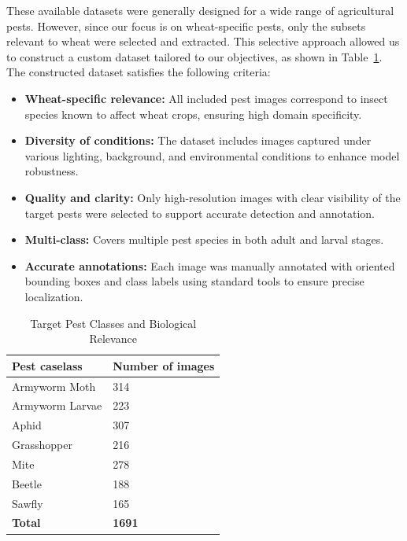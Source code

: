 These available datasets were generally designed for a wide range of agricultural pests. However, since our focus is on wheat-specific pests, only the subsets relevant to wheat were selected and extracted. This selective approach allowed us to construct a custom dataset tailored to our objectives, as shown in Table~\ref{tab:target-pest-classes}. The constructed dataset satisfies the following criteria:

\begin{itemize}
    \item \textbf{Wheat-specific relevance:} All included pest images correspond to insect species known to affect wheat crops, ensuring high domain specificity.
    \item \textbf{Diversity of conditions:} The dataset includes images captured under various lighting, background, and environmental conditions to enhance model robustness.
    \item \textbf{Quality and clarity:} Only high-resolution images with clear visibility of the target pests were selected to support accurate detection and annotation.
    \item \textbf{Multi-class:} Covers multiple pest species in both adult and larval stages.
    \item \textbf{Accurate annotations:} Each image was manually annotated with oriented bounding boxes and class labels using standard tools to ensure precise localization.
\end{itemize}


\begin{table}[htbp]
    \caption{Target Pest Classes and Biological Relevance}
    \centering
    \begin{tabular}{|p{4cm}|p{6cm}|}
    \hline
    \textbf{Pest caselass}  & \textbf{Number of images} \\
    \hline
    Armyworm Moth  & 314 \\
    \hline
    Armyworm Larvae & 223 \\
    \hline
    Aphid &  307 \\
    \hline
    Grasshopper  & 216 \\
    \hline
    Mite &  278 \\
    \hline
    Beetle  & 188 \\
    \hline
    Sawfly & 165 \\
    \hline
    \textbf{Total} & \textbf{1691} \\
    \hline
    \end{tabular}
    \label{tab:target-pest-classes}
\end{table}

